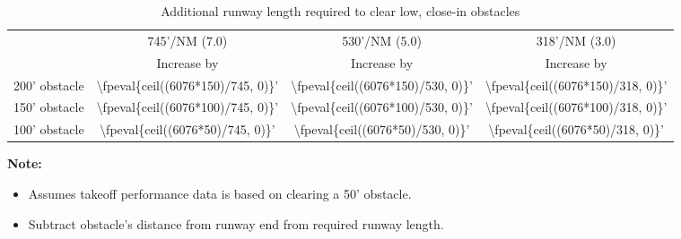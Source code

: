 \documentclass{article}
\begin{document}
\begin{table}[ht]
    \caption{Additional runway length required to clear low, close-in obstacles}

    \begin{center}
        \begin{tabular}{lccc}
            \toprule
                          & \multicolumn{1}{c}{745'/NM (7.0\textdegree{})} & \multicolumn{1}{c}{530'/NM (5.0\textdegree{})} & \multicolumn{1}{c}{318'/NM (3.0\textdegree{})}
            \\\cmidrule(lr){2-2}\cmidrule(lr){3-3}\cmidrule(lr){4-4}
                          & Increase by                                    & Increase by                                    & Increase by                                    \\\midrule
            200' obstacle & \num{\fpeval{ceil((6076*150)/745, 0)}}'        & \num{\fpeval{ceil((6076*150)/530, 0)}}'        & \num{\fpeval{ceil((6076*150)/318, 0)}}'        \\
            150' obstacle & \num{\fpeval{ceil((6076*100)/745, 0)}}'        & \num{\fpeval{ceil((6076*100)/530, 0)}}'        & \num{\fpeval{ceil((6076*100)/318, 0)}}'        \\
            100' obstacle & \num{\fpeval{ceil((6076*50)/745, 0)}}'         & \num{\fpeval{ceil((6076*50)/530, 0)}}'         & \num{\fpeval{ceil((6076*50)/318, 0)}}'         \\
        \end{tabular}
    \end{center}

    \textbf{Note:}
    \begin{itemize}
        \item Assumes takeoff performance data is based on clearing a 50' obstacle.
        \item Subtract obstacle's distance from runway end from required runway length.
    \end{itemize}
\end{table}
\end{document}
